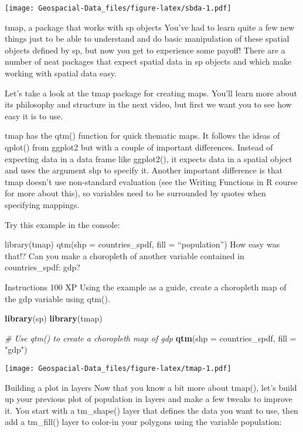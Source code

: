 \documentclass[]{article}
\newenvironment{Shaded}{\begin{snugshade}}{\end{snugshade}}
\newcommand{\CommentTok}[1]{\textcolor[rgb]{0.56,0.35,0.01}{\textit{#1}}}
\newcommand{\DataTypeTok}[1]{\textcolor[rgb]{0.13,0.29,0.53}{#1}}
\newcommand{\KeywordTok}[1]{\textcolor[rgb]{0.13,0.29,0.53}{\textbf{#1}}}
\newcommand{\NormalTok}[1]{#1}
\newcommand{\StringTok}[1]{\textcolor[rgb]{0.31,0.60,0.02}{#1}}
\begin{document}
\texttt{[image: Geospacial-Data\_files/figure-latex/sbda-1.pdf]}

tmap, a package that works with sp objects You've had to learn quite a
few new things just to be able to understand and do basic manipulation
of these spatial objects defined by sp, but now you get to experience
some payoff! There are a number of neat packages that expect spatial
data in sp objects and which make working with spatial data easy.

Let's take a look at the tmap package for creating maps. You'll learn
more about its philosophy and structure in the next video, but first we
want you to see how easy it is to use.

tmap has the qtm() function for quick thematic maps. It follows the
ideas of qplot() from ggplot2 but with a couple of important
differences. Instead of expecting data in a data frame like ggplot2(),
it expects data in a spatial object and uses the argument shp to specify
it. Another important difference is that tmap doesn't use non-standard
evaluation (see the Writing Functions in R course for more about this),
so variables need to be surrounded by quotes when specifying mappings.

Try this example in the console:

library(tmap) qtm(shp = countries\_spdf, fill = ``population'') How easy
was that!? Can you make a choropleth of another variable contained in
countries\_spdf: gdp?

Instructions 100 XP Using the example as a guide, create a choropleth
map of the gdp variable using qtm().

\begin{Shaded}
\begin{Highlighting}[]
\KeywordTok{library}\NormalTok{(sp)}
\KeywordTok{library}\NormalTok{(tmap)}

\CommentTok{# Use qtm() to create a choropleth map of gdp}
\KeywordTok{qtm}\NormalTok{(}\DataTypeTok{shp =}\NormalTok{ countries_spdf, }\DataTypeTok{fill =} \StringTok{"gdp"}\NormalTok{)}
\end{Highlighting}
\end{Shaded}

\texttt{[image: Geospacial-Data\_files/figure-latex/tmap-1.pdf]}

Building a plot in layers Now that you know a bit more about tmap(),
let's build up your previous plot of population in layers and make a few
tweaks to improve it. You start with a tm\_shape() layer that defines
the data you want to use, then add a tm\_fill() layer to color-in your
polygons using the variable population:
\end{document}

